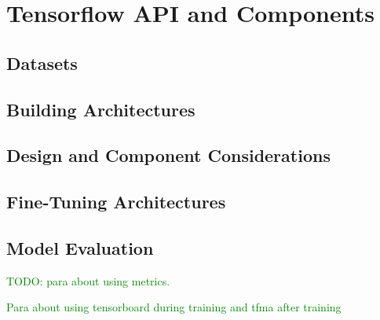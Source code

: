 \chapter{Tensorflow API and Components}

\section{Datasets}






\section{Building Architectures}








\section{Design and Component Considerations}














\section{Fine-Tuning Architectures}






\section{Model Evaluation}

\textcolor{green}{TODO: para about using metrics.}

\textcolor{green}{Para about using tensorboard during training and tfma after training}

